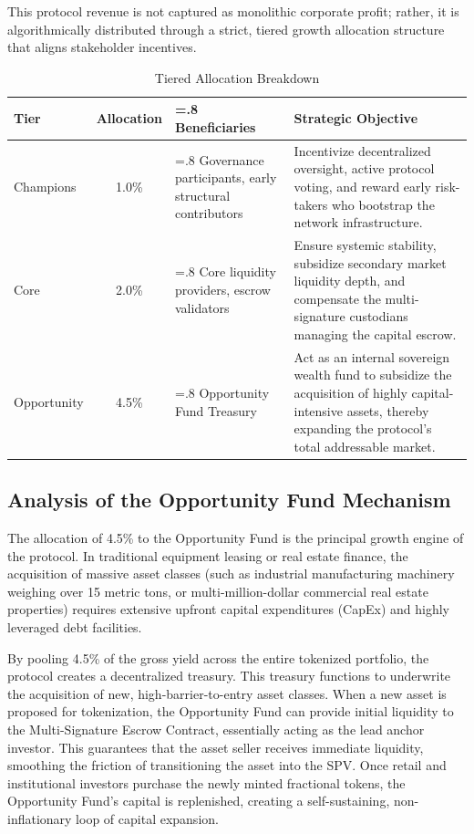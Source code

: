 \documentclass{Resources/bdlt-project}
\begin{document}
This protocol revenue is not captured as monolithic corporate profit; rather, it is algorithmically distributed through a strict, tiered growth allocation structure that aligns stakeholder incentives.

\begin{table}[htbp]
\centering
\renewcommand{\arraystretch}{1.5}
\begin{tabularx}{\textwidth}{lc>{\hsize=.8\hsize}X>{\hsize=1.2\hsize}X}
\toprule
\textbf{Tier} & \textbf{Allocation} & \textbf{Beneficiaries} & \textbf{Strategic Objective} \\
\midrule
Champions & 1.0\% & Governance participants, early structural contributors & Incentivize decentralized oversight, active protocol voting, and reward early risk-takers who bootstrap the network infrastructure. \\
Core & 2.0\% & Core liquidity providers, escrow validators & Ensure systemic stability, subsidize secondary market liquidity depth, and compensate the multi-signature custodians managing the capital escrow. \\
Opportunity & 4.5\% & Opportunity Fund Treasury & Act as an internal sovereign wealth fund to subsidize the acquisition of highly capital-intensive assets, thereby expanding the protocol's total addressable market. \\
\bottomrule
\end{tabularx}
\caption{Tiered Allocation Breakdown}
\end{table}

\subsection{Analysis of the Opportunity Fund Mechanism}
The allocation of 4.5\% to the Opportunity Fund is the principal growth engine of the protocol. In traditional equipment leasing or real estate finance, the acquisition of massive asset classes (such as industrial manufacturing machinery weighing over 15 metric tons, or multi-million-dollar commercial real estate properties) requires extensive upfront capital expenditures (CapEx) and highly leveraged debt facilities.

By pooling 4.5\% of the gross yield across the entire tokenized portfolio, the protocol creates a decentralized treasury. This treasury functions to underwrite the acquisition of new, high-barrier-to-entry asset classes. When a new asset is proposed for tokenization, the Opportunity Fund can provide initial liquidity to the Multi-Signature Escrow Contract, essentially acting as the lead anchor investor. This guarantees that the asset seller receives immediate liquidity, smoothing the friction of transitioning the asset into the SPV. Once retail and institutional investors purchase the newly minted fractional tokens, the Opportunity Fund's capital is replenished, creating a self-sustaining, non-inflationary loop of capital expansion.
\end{document}

